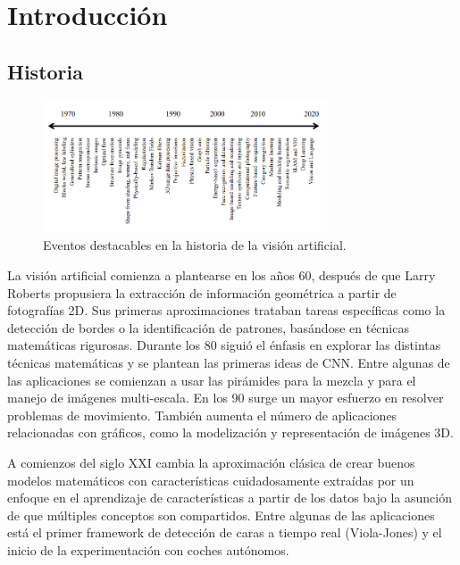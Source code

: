 \section{Introducción}

\subsection{Historia}


\begin{figure}[h]
  \centerfloat
  \includegraphics[width=0.75\textwidth]{img/history.png}
  \caption{Eventos destacables en la historia de la visión artificial.}
\end{figure}

La visión artificial comienza a plantearse en los años 60, después de que Larry Roberts propusiera la extracción de información geométrica a partir de fotografías 2D.
Sus primeras aproximaciones trataban tareas específicas como la detección de bordes o la identificación de patrones, basándose en técnicas matemáticas rigurosas.
Durante los 80 siguió el énfasis en explorar las distintas técnicas matemáticas y se plantean las primeras ideas de CNN. Entre algunas de las aplicaciones se comienzan a usar las pirámides para la mezcla y para el manejo de imágenes multi-escala.
En los 90 surge un mayor esfuerzo en resolver problemas de movimiento. También aumenta el número de aplicaciones relacionadas con gráficos, como la modelización y representación de imágenes 3D.

\vspace{\baselineskip}

A comienzos del siglo XXI cambia la aproximación clásica de crear buenos modelos matemáticos con características cuidadosamente extraídas por un enfoque en el aprendizaje de características a partir de los datos bajo la asunción de que múltiples conceptos son compartidos. Entre algunas de las aplicaciones está el primer framework de detección de caras a tiempo real (Viola-Jones) y el inicio de la experimentación con coches autónomos.

